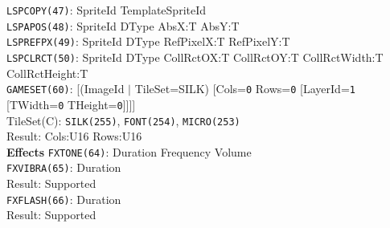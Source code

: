 \documentclass[a4paper,twocolumn,11pt]{article}
\begin{document}
\begin{flushleft}
\vskip 4pt
{\tt LSPCOPY(47)}: SpriteId TemplateSpriteId \\
\vskip 4pt
{\tt LSPAPOS(48)}: SpriteId DType AbsX:T AbsY:T \\
\vskip 4pt
{\tt LSPREFPX(49)}: SpriteId DType RefPixelX:T RefPixelY:T \\
\vskip 4pt
{\tt LSPCLRCT(50)}: SpriteId DType CollRctOX:T CollRctOY:T CollRctWidth:T CollRctHeight:T \\
\vskip 4pt
{\tt GAMESET(60)}: [(ImageId $|$ TileSet=SILK) [Cols={\tt 0} Rows={\tt 0} [LayerId={\tt 1} [TWidth={\tt 0} THeight={\tt 0}]]]] \\
TileSet(C): {\tt SILK(255)}, {\tt FONT(254)}, {\tt MICRO(253)} \\
Result: Cols:U16 Rows:U16 \\
\vskip 6pt
{\bf Effects}
\vskip 2pt
{\tt FXTONE(64)}: Duration Frequency Volume \\
\vskip 4pt
{\tt FXVIBRA(65)}: Duration \\
Result: Supported \\
\vskip 4pt
{\tt FXFLASH(66)}: Duration \\
Result: Supported \\
\vskip 4pt
\end{flushleft}
\end{document}
